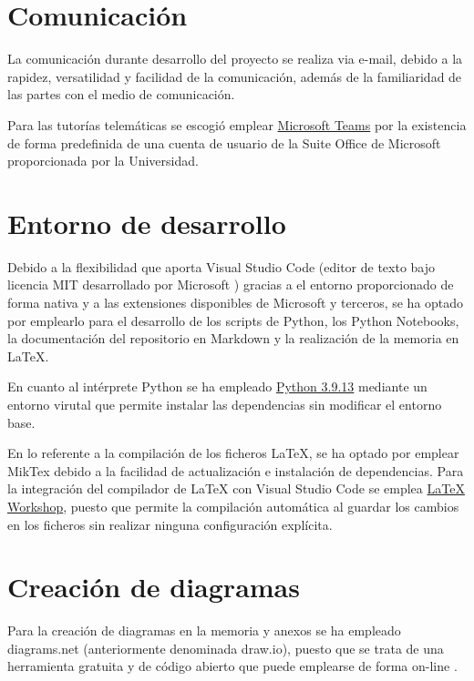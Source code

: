 \section{Comunicación}
La comunicación durante desarrollo del proyecto se realiza via e-mail, debido a la rapidez,
versatilidad y facilidad de la comunicación, además de la familiaridad de las partes con el 
medio de comunicación.

Para las tutorías telemáticas se escogió emplear 
\href{https://www.microsoft.com/es-es/microsoft-teams/log-in}{Microsoft Teams} por la existencia 
de forma predefinida de una cuenta de usuario de la Suite Office de Microsoft proporcionada
por la Universidad.

\section{Entorno de desarrollo}
Debido a la flexibilidad que aporta Visual Studio Code (editor de texto bajo licencia MIT desarrollado por Microsoft \cite{enwiki:vscode2023})
gracias a el entorno proporcionado de forma nativa y a las extensiones disponibles de Microsoft y terceros, se ha optado
por emplearlo para el desarrollo de los scripts de Python, los Python Notebooks, la documentación del repositorio
en Markdown y la realización de la memoria en LaTeX. 

En cuanto al intérprete Python se ha empleado \href{https://www.python.org/downloads/release/python-3913/}{Python 3.9.13} mediante un entorno virutal que permite instalar
las dependencias sin modificar el entorno base.

En lo referente a la compilación de los ficheros LaTeX, se ha optado por emplear 
MikTex debido a la facilidad de actualización e instalación de dependencias.
Para la integración del compilador de LaTeX con Visual Studio Code se emplea 
\href{https://marketplace.visualstudio.com/items?itemName=James-Yu.latex-workshop}{LaTeX Workshop}, 
puesto que permite la compilación automática al guardar los cambios en los ficheros sin realizar
ninguna configuración explícita.

\section{Creación de diagramas}
Para la creación de diagramas en la memoria y anexos se ha empleado diagrams.net (anteriormente 
denominada draw.io), puesto que se trata de una herramienta gratuita y de código abierto que 
puede emplearse de forma on-line \cite{misc:wikipediaDiagrams}. 

